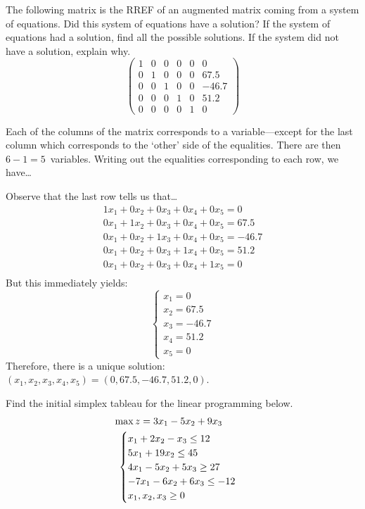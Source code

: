 \documentclass[12pt,letterpaper]{exam}
\begin{document}
\begin{questions}
\newpage
\question[10] The following matrix is the RREF of an augmented matrix coming from a system of equations. Did this system of equations have a solution? If the system of equations had a solution, find all the possible solutions. If the system did not have a solution, explain why. 
	\[
	\begin{pmatrix}
	1 & 0 & 0 & 0 & 0 & 0 \\
	0 & 1 & 0 & 0 & 0 & 67.5 \\
	0 & 0 & 1 & 0 & 0 & -46.7 \\
	0 & 0 & 0 & 1 & 0 & 51.2 \\
	0 & 0 & 0 & 0 & 1 & 0 
	\end{pmatrix}
	\] \pspace

\sol Each of the columns of the matrix corresponds to a variable---except for the last column which corresponds to the `other' side of the equalities. There are then $6 - 1= 5$~variables. Writing out the equalities corresponding to each row, we have\dots

Observe that the last row tells us that\dots
	\[
	\begin{gathered}
	1x_1 + 0x_2 + 0x_3 + 0x_4 + 0x_5= 0 \\
	0x_1 + 1x_2 + 0x_3 + 0x_4 + 0x_5= 67.5 \\
	0x_1 + 0x_2 + 1x_3 + 0x_4 + 0x_5= -46.7 \\
	0x_1 + 0x_2 + 0x_3 + 1x_4 + 0x_5= 51.2 \\
	0x_1 + 0x_2 + 0x_3 + 0x_4 + 1x_5= 0 \\
	\end{gathered}
	\]
But this immediately yields:
	\[
	\begin{cases}
	x_1= 0 \\
	x_2= 67.5 \\
	x_3= -46.7 \\
	x_4= 51.2 \\
	x_5= 0
	\end{cases}
	\]
Therefore, there is a unique solution: $(x_1, x_2, x_3, x_4, x_5)= (0, 67.5, -46.7, 51.2, 0)$. 



\newpage
\question[10] Find the initial simplex tableau for the linear programming below. 
	\[
	\begin{gathered}
	\hspace{-1cm} \max z= 3x_1 - 5x_2 + 9x_3 \\
	\begin{cases}
	x_1 + 2x_2 - x_3 \leq 12 \\
	5x_1 + 19x_2 \leq 45 \\
	4x_1 - 5x_2 + 5x_3 \geq 27 \\
	-7x_1 - 6x_2 + 6x_3 \leq -12 \\
	x_1, x_2, x_3 \geq 0
	\end{cases}
	\end{gathered}
	\] \pspace


\end{questions}
\end{document}
